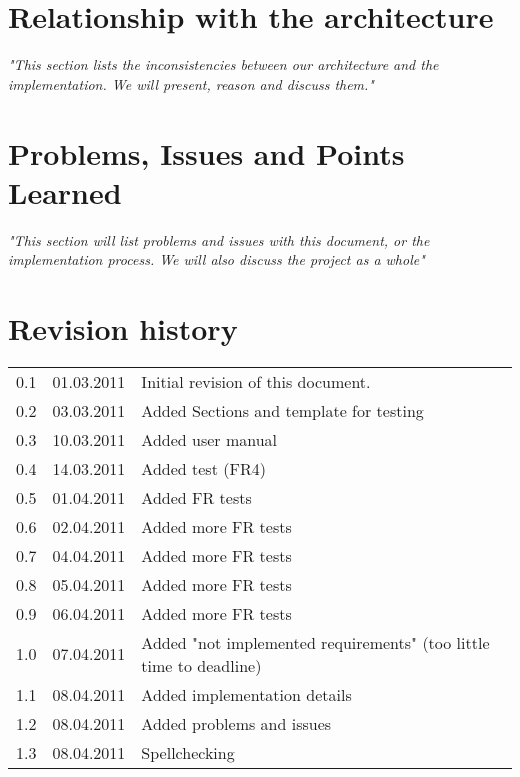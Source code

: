 \documentclass[titlepage,a4paper,11pt]{article}
\begin{document}
\section{Relationship with the architecture}
\emph{"This section lists the inconsistencies between our architecture and the implementation. We will present, reason and discuss them."}
\newpage	
	

\section{Problems, Issues and Points Learned}
\emph{"This section will list problems and issues with this document, or the implementation process. We will also discuss the project as a whole"}
\newpage
	

\section{Revision history}


\begin{table}[H]
  \begin{tabular}{| c | c | p{5cm} |}
    \hline
    0.1 & 01.03.2011 & Initial revision of this document. \\
	0.2 & 03.03.2011 & Added Sections and template for testing \\
	0.3 & 10.03.2011 & Added user manual \\
	0.4 & 14.03.2011 & Added test (FR4) \\
	0.5 & 01.04.2011 & Added FR tests \\
	0.6 & 02.04.2011 & Added more FR tests \\
	0.7 & 04.04.2011 & Added more FR tests \\
	0.8 & 05.04.2011 & Added more FR tests \\
	0.9 & 06.04.2011 & Added more FR tests \\
	1.0 & 07.04.2011 & Added "not implemented requirements" (too little time to deadline) \\
	1.1 & 08.04.2011 & Added implementation details \\
	1.2 & 08.04.2011 & Added problems and issues \\
	1.3 & 08.04.2011 & Spellchecking \\
    \hline
  \end{tabular}
\end{table}

\printbibliography
\end{document}

